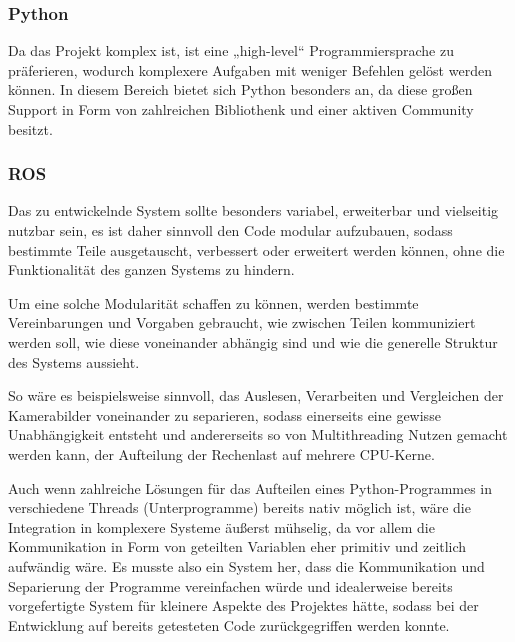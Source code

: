 \documentclass[12pt, ngerman]{article}
\begin{document}
\subsubsection{Python}
Da das Projekt komplex ist, ist eine „high-level“ Programmiersprache zu präferieren, wodurch komplexere Aufgaben mit weniger Befehlen gelöst werden können. In diesem Bereich bietet sich Python besonders an, da diese großen Support in Form von zahlreichen Bibliothenk und einer aktiven Community besitzt. 

\subsubsection{ROS}
Das zu entwickelnde System sollte besonders variabel, erweiterbar und vielseitig nutzbar sein, es ist daher sinnvoll den Code modular aufzubauen, sodass bestimmte Teile ausgetauscht, verbessert oder erweitert werden können, ohne die Funktionalität des ganzen Systems zu hindern.  

Um eine solche Modularität schaffen zu können, werden bestimmte Vereinbarungen und Vorgaben gebraucht, wie zwischen Teilen kommuniziert werden soll, wie diese voneinander abhängig sind und wie die generelle Struktur des Systems aussieht.  

So wäre es beispielsweise sinnvoll, das Auslesen, Verarbeiten und Vergleichen der Kamerabilder voneinander zu separieren, sodass einerseits eine gewisse Unabhängigkeit entsteht und andererseits so von Multithreading Nutzen gemacht werden kann, der Aufteilung der Rechenlast auf mehrere CPU-Kerne.  

Auch wenn zahlreiche Lösungen für das Aufteilen eines Python-Programmes in verschiedene Threads (Unterprogramme) bereits nativ möglich ist, wäre die Integration in komplexere Systeme äußerst mühselig, da vor allem die Kommunikation in Form von geteilten Variablen eher primitiv und zeitlich aufwändig wäre. Es musste also ein System her, dass die Kommunikation und Separierung der Programme vereinfachen würde und idealerweise bereits vorgefertigte System für kleinere Aspekte des Projektes hätte, sodass bei der Entwicklung auf bereits getesteten Code zurückgegriffen werden konnte. 
\end{document}
